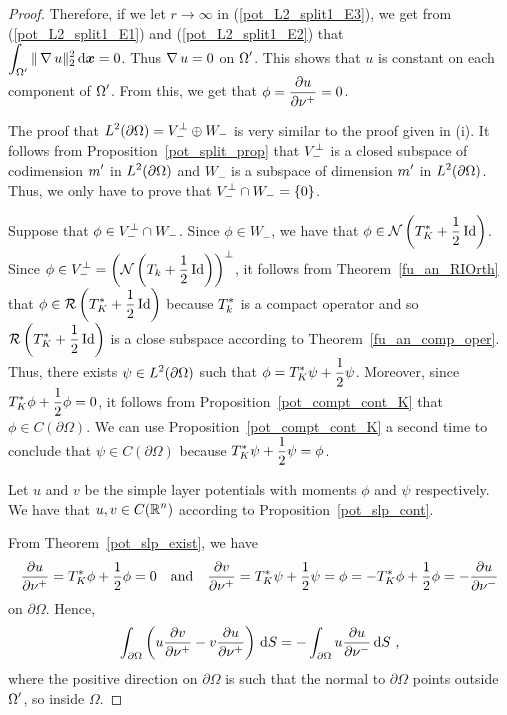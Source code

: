 \begin{proof}
Therefore, if we let $r \to \infty$ in (\ref{pot_L2_split1_E3}), we
get from (\ref{pot_L2_split1_E1}) and (\ref{pot_L2_split1_E2}) that\\
$\displaystyle \int_{\Omega^{\prime}} \|\operatorname{\nabla} u\|_2^2 \,\mathrm{d}{{\bm{x}}} = 0$.
Thus $\operatorname{\nabla} u = 0$ on $\displaystyle \Omega^{\prime}$.  This shows that $u$ is
constant on each component of $\displaystyle \Omega^{\prime}$.  From
this, we get that $\displaystyle \phi = \frac{\partial{u}}{\partial \nu^+} = 0$.

 The proof that
$\displaystyle L^2(\partial \Omega) = V_-^\perp \oplus W_-$ is very
similar to the proof given in (i). It
follows from Proposition~\ref{pot_split_prop} that
$\displaystyle V_-^\perp$ is a
closed subspace of codimension $\displaystyle m^{\prime}$ in
$\displaystyle L^2(\partial \Omega)$ and $W_-$
is a subspace of dimension $\displaystyle m^{\prime}$ in
$\displaystyle L^2(\partial \Omega)$.  Thus, we
only have to prove that $\displaystyle V_-^\perp \cap W_- = \{0\}$.

Suppose that $\displaystyle \phi \in V_-^\perp \cap W_-$.
Since $\phi \in W_-$, we have that
$\displaystyle \phi \in \mathcal{N} \left(T^\ast_K + \frac{1}{2} \operatorname{Id}\right)$.
Since $\displaystyle \phi \in V_-^\perp
= \left(\mathcal{N} \left(T_k + \frac{1}{2} \operatorname{Id}\right)\right)^\perp$,
it follows from Theorem~\ref{fu_an_RIOrth} that
$\displaystyle \phi \in \mathcal{R} \left( T^\ast_K + \frac{1}{2} \operatorname{Id}\right)$ because
$\displaystyle T_k^\ast$ is a compact operator
and so $\displaystyle \mathcal{R} \left( T^\ast_K + \frac{1}{2} \operatorname{Id}\right)$
is a close subspace according to Theorem~\ref{fu_an_comp_oper}.  Thus, there
exists $\displaystyle \psi \in L^2(\partial \Omega)$ such that
$\displaystyle \phi = T^\ast_K \psi + \frac{1}{2} \psi$.  Moreover,
since $\displaystyle T^\ast_K\phi + \frac{1}{2} \phi = 0$, it follows
from Proposition~\ref{pot_compt_cont_K} that
$\phi \in C(\partial \Omega)$.  We can use 
Proposition~\ref{pot_compt_cont_K} a second time to conclude that
$\psi \in C(\partial \Omega)$ because
$\displaystyle T^\ast_K \psi + \frac{1}{2} \psi = \phi$.

Let $u$ and $v$ be the simple layer potentials with moments $\phi$ and
$\psi$ respectively.    We have that $\displaystyle u,v \in C(\mathbb{R}^n)$
according to Proposition~\ref{pot_slp_cont}.

From Theorem~\ref{pot_slp_exist}, we have
\[
  \frac{\partial{u}}{\partial \nu^+} = T^\ast_K \phi + \frac{1}{2} \phi = 0
\quad \text{and} \quad
  \frac{\partial{v}}{\partial \nu^+} = T^\ast_K \psi + \frac{1}{2} \psi
= \phi = - T^\ast_K \phi + \frac{1}{2} \phi
= - \frac{\partial{u}}{\partial \nu^-}
\]
on $\partial \Omega$.  Hence,
\begin{equation} \label{pot_L2_split1_E4}
\int_{\partial \Omega} \left( u \frac{\partial{v}}{\partial \nu^+}
- v \frac{\partial{u}}{\partial \nu^+} \right) \,\mathrm{d}{S}
= - \int_{\partial \Omega} u \frac{\partial{u}}{\partial \nu^-} \,\mathrm{d}{S} \ ,
\end{equation}
where the positive direction on $\partial \Omega$ is such that the
normal to $\partial \Omega$ points outside
$\displaystyle \Omega^{\prime}$, so inside $\Omega$.


\end{proof}
